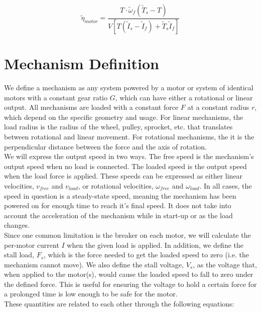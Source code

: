 \documentclass[a4paper]{article}
\begin{document}
	\begin{equation}
		\widetilde{\eta}_{motor} = \frac{T \cdot \widetilde{\omega}_f \left( \widetilde{T}_s - T \right)}{V \left[ T \left( \widetilde{I}_s - \widetilde{I}_f \right) + \widetilde{T}_s \widetilde{I}_f \right]}
	\end{equation}
	
	
	\section*{Mechanism Definition}
	
	We define a mechanism as any system powered by a motor or system of identical motors with a constant gear ratio $ G $, which can have either a rotational or linear output. All mechanisms are loaded with a constant force $ F $ at a constant radius $ r $, which depend on the specific geometry and usage. For linear mechanisms, the load radius is the radius of the wheel, pulley, sprocket, etc. that translates between rotational and linear movement. For rotational mechanisms, the it is the perpendicular distance between the force and the axis of rotation.\\
	
	We will express the output speed in two ways. The free speed is the mechanism's output speed when no load is connected. The loaded speed is the output speed when the load force is applied. These speeds can be expressed as either linear velocities, $ v_{free} $ and $ v_{load} $, or rotational velocities, $ \omega_{free} $ and $ \omega_{load} $. In all cases, the speed in question is a steady-state speed, meaning the mechanism has been powered on for enough time to reach it's final speed. It does not take into account the acceleration of the mechanism while in start-up or as the load changes.\\
	
	Since one common limitation is the breaker on each motor, we will calculate the per-motor current $ I $ when the given load is applied. In addition, we define the stall load, $ F_s $, which is the force needed to get the loaded speed to zero (i.e. the mechanism cannot move). We also define the stall voltage, $ V_s $, as the voltage that, when applied to the motor(s), would cause the loaded speed to fall to zero under the defined force. This is useful for ensuring the voltage to hold a certain force for a prolonged time is low enough to be safe for the motor.\\
	
	These quantities are related to each other through the following equations:
	
\end{document}

